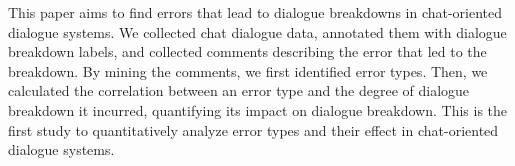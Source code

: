 This paper aims to find errors that lead to dialogue breakdowns in chat-oriented dialogue systems. We collected chat dialogue data, annotated them with dialogue breakdown labels, and collected comments describing the error that led to the breakdown. By mining the comments, we first identified error types. Then, we calculated the correlation between an error type and the degree of dialogue breakdown it incurred, quantifying its impact on dialogue breakdown. This is the first study to quantitatively analyze error types and their effect in chat-oriented dialogue systems.
